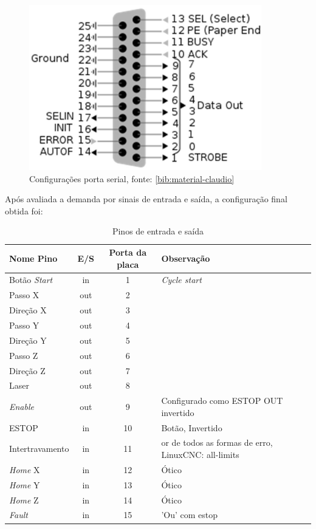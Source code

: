\documentclass[
	article,			%
	11pt,				%
	oneside,			%
	a4paper,			%
	section=TITLE,		%
	english,			%
	brazil,				%
	sumario=tradicional
	]{abntex2}
\newcommand{\LCNC}{LinuxCNC}
\begin{document}
\hfill
\begin{minipage}{0.49\textwidth}
\begin{figure}[H]
    \centering
    \includegraphics[width=0.9\textwidth]{img/parport.png}
    \caption{Configurações porta serial, fonte: \ref{bib:material-claudio}}
    \label{fig:porta-serial}
\end{figure}
\end{minipage}

Após avaliada a demanda por sinais de entrada e saída, a configuração final obtida foi:

\begin{table}[H]
    \centering
    \begin{tabular}{l|c|c|l}
        \toprule
        Nome Pino   & E/S & Porta da placa & Observação \\
        \midrule
        Botão \textit{Start} & in & 1    & \textit{Cycle start} \\
        Passo X      & out & 2   & \\
        Direção X    & out & 3   & \\
        Passo Y      & out & 4   & \\
        Direção Y    & out & 5   & \\
        Passo Z      & out & 6   & \\
        Direção Z    & out & 7   & \\
        Laser        & out & 8   & \\ 
        \textit{Enable}      & out & 9   & Configurado como ESTOP OUT invertido \\
        ESTOP       & in  & 10  & Botão, Invertido \\
        Intertravamento & in & 11 & or de todos as formas de erro, \LCNC: all-limits  \\
        \textit{Home} X & in & 12 & Ótico   \\ 
        \textit{Home} Y & in & 13 & Ótico   \\ 
        \textit{Home} Z & in & 14 & Ótico   \\ 
        \textit{Fault} & in  & 15 & 'Ou' com estop \\
        \bottomrule 
    \end{tabular}
    \caption{Pinos de entrada e saída }
    \label{tab:uso-io}
\end{table}
\end{document}
